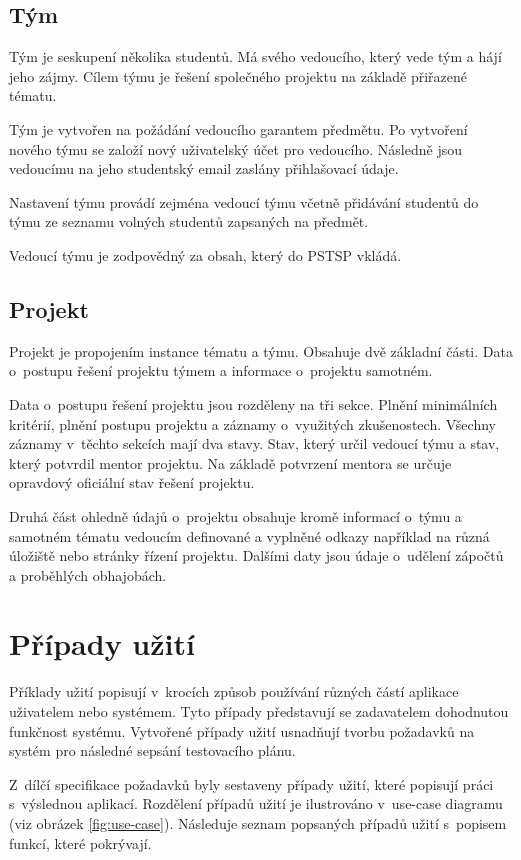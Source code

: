 \documentclass[czech,BP]{thesiskiv}
\begin{document}
		\subsection{Tým}
		\par Tým je seskupení několika studentů. Má svého vedoucího, který vede tým a hájí jeho zájmy. Cílem týmu je řešení společného projektu na základě přiřazené tématu.
		\par Tým je vytvořen na požádání vedoucího garantem předmětu. Po vytvoření nového týmu se založí nový uživatelský účet pro vedoucího. Následně jsou vedoucímu na jeho studentský email zaslány přihlašovací údaje.
		\par Nastavení týmu provádí zejména vedoucí týmu včetně přidávání studentů do týmu ze seznamu volných studentů zapsaných na předmět.
		\par Vedoucí týmu je zodpovědný za obsah, který do PSTSP vkládá.
		\subsection{Projekt}
		\par Projekt je propojením instance tématu a týmu. Obsahuje dvě základní části. Data o~postupu řešení projektu týmem a informace o~projektu samotném. 
		\par Data o~postupu řešení projektu jsou rozděleny na tři sekce. Plnění minimálních kritérií, plnění postupu projektu a záznamy o~využitých zkušenostech. Všechny záznamy v~těchto sekcích mají dva stavy. Stav, který určil vedoucí týmu a stav, který potvrdil mentor projektu. Na základě potvrzení mentora se určuje opravdový oficiální stav řešení projektu.
		\par Druhá část ohledně údajů o~projektu obsahuje kromě informací o~týmu a samotném tématu vedoucím definované a vyplněné odkazy například na různá úložiště nebo stránky řízení projektu. Dalšími daty jsou údaje o~udělení zápočtů a proběhlých obhajobách.
	\section{Případy užití}
		\par Příklady užití popisují v~krocích způsob používání různých částí aplikace uživatelem nebo systémem. Tyto případy představují se zadavatelem dohodnutou funkčnost systému. Vytvořené případy užití usnadňují tvorbu požadavků na systém pro následné sepsání testovacího plánu.
		\par Z~dílčí specifikace požadavků byly sestaveny případy užití, které popisují práci s~výslednou aplikací. Rozdělení případů užití je ilustrováno v~use-case diagramu (viz obrázek \ref{fig:use-case}). Následuje seznam popsaných případů užití s~popisem funkcí, které pokrývají.
\end{document}
